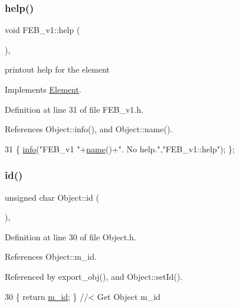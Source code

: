 \subsubsection{\texorpdfstring{help()}{help()}}
{\footnotesize\ttfamily void F\+E\+B\+\_\+v1\+::help (\begin{DoxyParamCaption}{ }\end{DoxyParamCaption})\hspace{0.3cm}{\ttfamily [inline]}, {\ttfamily [virtual]}}

printout help for the element 

Implements \hyperlink{classElement_a32c0de27acb08e17251cef88c3e9303a}{Element}.



Definition at line 31 of file F\+E\+B\+\_\+v1.\+h.



References Object\+::info(), and Object\+::name().


\begin{DoxyCode}
31 \{ \hyperlink{classObject_a644fd329ea4cb85f54fa6846484b84a8}{info}(\textcolor{stringliteral}{"FEB\_v1 "}+\hyperlink{classObject_a300f4c05dd468c7bb8b3c968868443c1}{name}()+\textcolor{stringliteral}{". No help."},\textcolor{stringliteral}{"FEB\_v1::help"}); \};
\end{DoxyCode}
\mbox{\label{classObject_af99145335cc61ff6e2798ea17db009d2}} 
\subsubsection{\texorpdfstring{id()}{id()}}
{\footnotesize\ttfamily unsigned char Object\+::id (\begin{DoxyParamCaption}{ }\end{DoxyParamCaption})\hspace{0.3cm}{\ttfamily [inline]}, {\ttfamily [inherited]}}



Definition at line 30 of file Object.\+h.



References Object\+::m\+\_\+id.



Referenced by export\+\_\+obj(), and Object\+::set\+Id().


\begin{DoxyCode}
30 \{ \textcolor{keywordflow}{return} \hyperlink{classObject_aca74b9dbfed7b5556ea2d56c65b6b6b0}{m\_id};         \} \textcolor{comment}{//< Get Object m\_id }
\end{DoxyCode}
\mbox{\label{classObject_a644fd329ea4cb85f54fa6846484b84a8}} 
